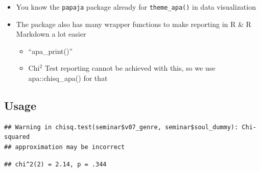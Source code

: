 \documentclass[
]{book}
\newenvironment{Shaded}{\begin{snugshade}}{\end{snugshade}}
\newcommand{\AttributeTok}[1]{\textcolor[rgb]{0.13,0.29,0.53}{#1}}
\newcommand{\CommentTok}[1]{\textcolor[rgb]{0.56,0.35,0.01}{\textit{#1}}}
\newcommand{\FunctionTok}[1]{\textcolor[rgb]{0.13,0.29,0.53}{\textbf{#1}}}
\newcommand{\NormalTok}[1]{#1}
\newcommand{\SpecialCharTok}[1]{\textcolor[rgb]{0.81,0.36,0.00}{\textbf{#1}}}
\newcommand{\StringTok}[1]{\textcolor[rgb]{0.31,0.60,0.02}{#1}}
\providecommand{\tightlist}{%
  \setlength{\itemsep}{0pt}\setlength{\parskip}{0pt}}
\begin{document}
\begin{itemize}
\tightlist
\item
  You know the \texttt{papaja} package already for \texttt{theme\_apa()} in data visualization
\item
  The package also has many wrapper functions to make reporting in R \& R Markdown a lot easier

  \begin{itemize}
  \tightlist
  \item
    ``apa\_print()''
  \item
    Chi\(^2\) Test reporting cannot be achieved with this, so we use apa::chisq\_apa() for that
  \end{itemize}
\end{itemize}

\subsection{Usage}\label{usage}

\begin{Shaded}
\end{Shaded}

\begin{verbatim}
## Warning in chisq.test(seminar$v07_genre, seminar$soul_dummy): Chi-squared
## approximation may be incorrect
\end{verbatim}

\begin{verbatim}
## chi^2(2) = 2.14, p = .344
\end{verbatim}

\begin{Shaded}
\end{Shaded}
\end{document}
